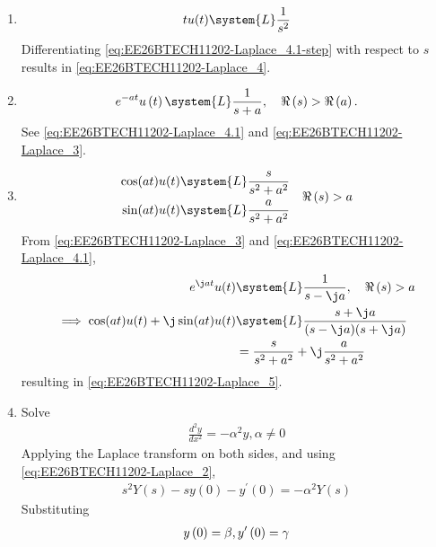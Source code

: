 \begin{enumerate}[label=\thesubsection.\arabic*, ref=\thesubsection.\theenumi]
\begin{align}
 \int_{0}^{\infty}  e^{-st} \, dt 
 = \brak{-\frac{e^{-st}}{s}}_{0}^{\infty}  = \frac{1}{s} \quad \Re\brak{s} > 0
\label{eq:EE26BTECH11202-Laplace_4.1-step}
\end{align}
\item 
\begin{align}
	tu(t) \system{L} \frac{1}{s^2} \label{eq:EE26BTECH11202-Laplace_4}
\end{align}
\solution Differentiating
\eqref{eq:EE26BTECH11202-Laplace_4.1-step}
with respect to $s$ results in 
\eqref{eq:EE26BTECH11202-Laplace_4}.
\item 
\begin{align}
	e^{-at} u\brak{t} \system{L} \frac{1}{s+a}, \quad \Re\brak{s} > \Re\brak{a}.
	\label{eq:EE26BTECH11202-Laplace-exp}
\end{align}
\solution  See 
	\eqref{eq:EE26BTECH11202-Laplace_4.1}
	and
	\eqref{eq:EE26BTECH11202-Laplace_3}.
\item 
\begin{align}
\begin{split}
	\cos(at) u(t)\system{L} \frac{s}{s^2 + a^2} 
	\\
	\sin(at) u(t)\system{L} \frac{a}{s^2 + a^2}  
\end{split}
\quad 
\Re\brak{s}>a 
\label{eq:EE26BTECH11202-Laplace_5}
\end{align}
\solution
From \eqref{eq:EE26BTECH11202-Laplace_3} and \eqref{eq:EE26BTECH11202-Laplace_4.1},
\begin{align}
	e^{\j at} u(t)&\system{L}  \frac{1}{s-\j a}, \quad  \Re\brak{s}>a \\
	\implies {\cos(at)u(t) + \j\sin(at)u(t)} &\system{L}
	\frac{s + \j a}{(s - \j a)(s + \j a)} 
						 \\
						 &= \frac{s}{s^2 + a^2} + \j \frac{a}{s^2 + a^2}
\end{align}
resulting in \eqref{eq:EE26BTECH11202-Laplace_5}.
\item Solve 
\begin{align}
	\frac{d^2 y}{d x^2}= -\alpha^2 y, \alpha \neq 0
\label{eq:EE26BTECH11202-Laplace_5-diff}
\end{align}
\solution 
Applying the Laplace transform on both sides, and using \eqref{eq:EE26BTECH11202-Laplace_2},
\begin{align}
	s^2Y(s)-sy(0)-y^{\prime}(0)=-\alpha^2 Y(s)
\label{eq:EE26BTECH11202-Laplace_5-diff-1}
\end{align}
Substituting
\begin{align}
y\brak{0} = \beta, y^{\prime}\brak{0} = \gamma

\end{align}
\end{enumerate}
